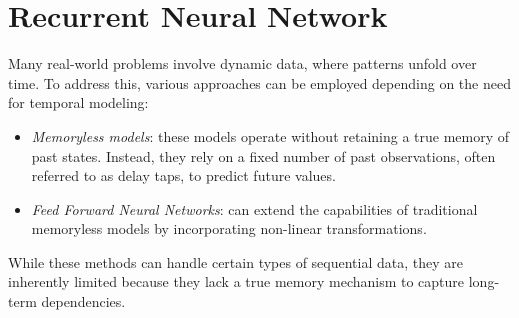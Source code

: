 \section{Recurrent Neural Network}

Many real-world problems involve dynamic data, where patterns unfold over time. 
To address this, various approaches can be employed depending on the need for temporal modeling: 
\begin{itemize}
    \item \textit{Memoryless models}: these models operate without retaining a true memory of past states. 
        Instead, they rely on a fixed number of past observations, often referred to as delay taps, to predict future values. 
    \item \textit{Feed Forward Neural Networks}: can extend the capabilities of traditional memoryless models by incorporating non-linear transformations. 
\end{itemize}
While these methods can handle certain types of sequential data, they are inherently limited because they lack a true memory mechanism to capture long-term dependencies.

